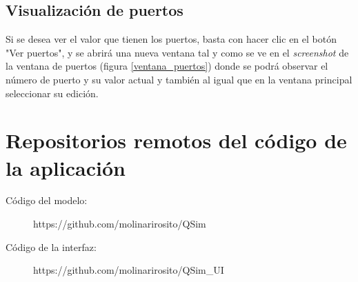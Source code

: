 
\subsection{Visualización de puertos}
Si se desea ver el valor que tienen los puertos, basta con hacer clic en el botón "Ver puertos", y se abrirá una nueva ventana tal y como se ve en el \textit{screenshot} de la ventana de puertos (figura \ref{ventana_puertos}) donde se podrá observar el número de puerto y su valor actual y también al igual que en la ventana principal seleccionar su edición.
\\


\section{Repositorios remotos del código de la aplicación}

\begin{description}
\item[Código del modelo:]
https://github.com/molinarirosito/QSim
\item[Código de la interfaz:]
https://github.com/molinarirosito/QSim\_UI
\end{description}
